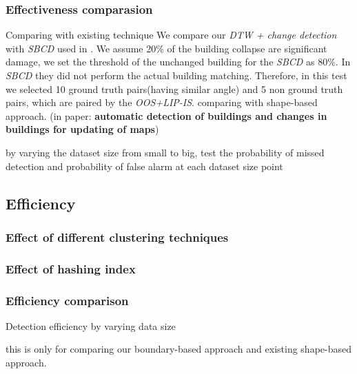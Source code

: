 \documentclass[runningheads,a4paper]{llncs}
\begin{document}
\subsubsection{Effectiveness comparasion}
Comparing with existing technique
We compare our \textit{DTW + change detection} with \textit{SBCD} used in \cite{rs2051217}. We assume 20\% of the building collapse are significant damage, we set the threshold of the unchanged building for the \textit{SBCD} as 80\%.
In \textit{SBCD} they did not perform the actual building matching. Therefore, in this test we selected 10 ground truth pairs(having similar angle) and 5 non ground truth pairs, which are paired by the \textit{OOS+LIP-IS}. 
comparing with shape-based approach. (in paper: \textbf{automatic detection of buildings and changes in buildings for updating of maps})

by varying the dataset size from small to big, test the probability of missed detection and probability of false alarm at each dataset size point


\subsection{Efficiency}

\subsubsection{Effect of different clustering techniques}
\subsubsection{Effect of hashing index}

\subsubsection{Efficiency comparison}

Detection efficiency by varying data size

this is only for comparing our boundary-based approach and existing shape-based approach.
\end{document}
